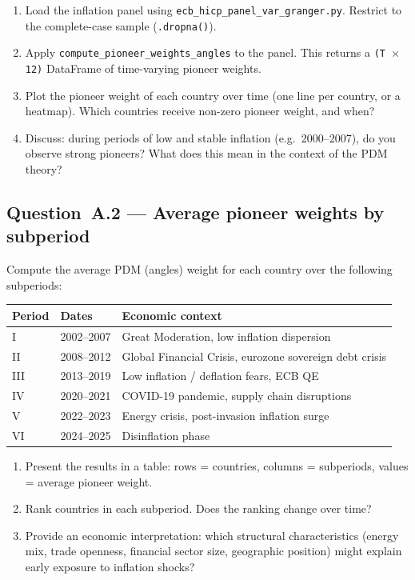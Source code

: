 \documentclass[11pt,a4paper]{article}
\begin{document}
\begin{enumerate}[label=(\alph*)]
    \item Load the inflation panel using \texttt{ecb\_hicp\_panel\_var\_granger.py}. Restrict to the complete-case sample (\texttt{.dropna()}).
    \item Apply \texttt{compute\_pioneer\_weights\_angles} to the panel. This returns a \texttt{(T $\times$ 12)} DataFrame of time-varying pioneer weights.
    \item Plot the pioneer weight of each country over time (one line per country, or a heatmap). Which countries receive non-zero pioneer weight, and when?
    \item Discuss: during periods of low and stable inflation (e.g.\ 2000--2007), do you observe strong pioneers? What does this mean in the context of the PDM theory?
\end{enumerate}

\subsection*{Question~A.2 --- Average pioneer weights by subperiod}

Compute the average PDM (angles) weight for each country over the following subperiods:

\begin{table}[h]
\centering
\small
\begin{tabular}{@{}lll@{}}
\toprule
Period & Dates & Economic context \\
\midrule
I   & 2002--2007 & Great Moderation, low inflation dispersion \\
II  & 2008--2012 & Global Financial Crisis, eurozone sovereign debt crisis \\
III & 2013--2019 & Low inflation / deflation fears, ECB QE \\
IV  & 2020--2021 & COVID-19 pandemic, supply chain disruptions \\
V   & 2022--2023 & Energy crisis, post-invasion inflation surge \\
VI  & 2024--2025 & Disinflation phase \\
\bottomrule
\end{tabular}
\end{table}

\begin{enumerate}[label=(\alph*)]
    \item Present the results in a table: rows = countries, columns = subperiods, values = average pioneer weight.
    \item Rank countries in each subperiod. Does the ranking change over time?
    \item Provide an economic interpretation: which structural characteristics (energy mix, trade openness, financial sector size, geographic position) might explain early exposure to inflation shocks?

\end{enumerate}
\end{document}
